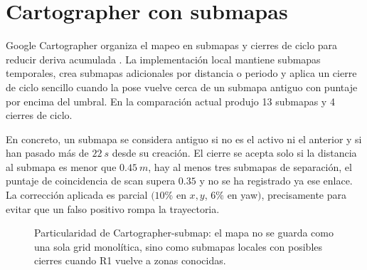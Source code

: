 \section{Cartographer con submapas}

Google Cartographer organiza el mapeo en submapas y cierres de ciclo para
reducir deriva acumulada \cite{hess2016}. La implementación local mantiene
submapas temporales, crea submapas adicionales por distancia o periodo y aplica un
cierre de ciclo sencillo cuando la pose vuelve cerca de un submapa antiguo con
puntaje por encima del umbral. En la comparación actual produjo 13 submapas y 4
cierres de ciclo.

En concreto, un submapa se considera antiguo si no es el activo ni el anterior y
si han pasado más de \(\SI{22}{s}\) desde su creación. El cierre se acepta solo
si la distancia al submapa es menor que \(\SI{0.45}{m}\), hay al menos tres
submapas de separación, el puntaje de coincidencia de scan supera \(0.35\) y no
se ha registrado ya ese enlace. La corrección aplicada es parcial
\((10\%\) en \(x,y\), \(6\%\) en yaw\()\), precisamente para evitar que un falso
positivo rompa la trayectoria.

\begin{figure}[H]
\centering
{}
\caption{Particularidad de Cartographer-submap: el mapa no se guarda como una sola grid monolítica, sino como submapas locales con posibles cierres cuando R1 vuelve a zonas conocidas.}
\label{fig:slam-cartographer-diagram}
\end{figure}

